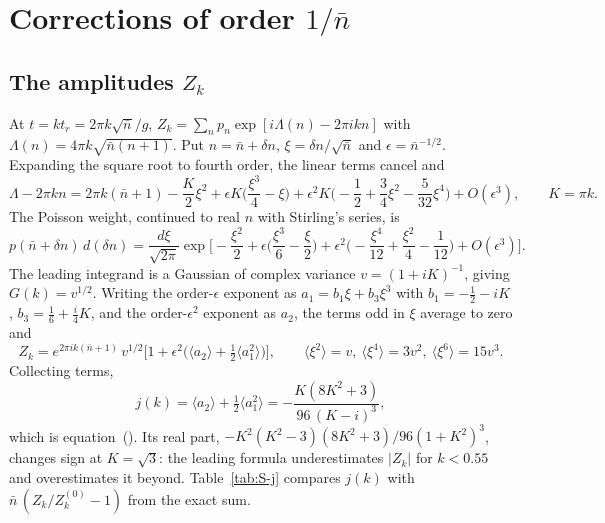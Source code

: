 \documentclass{iopjournal}
\newcommand{\nbar}{\bar{n}}
\begin{document}
\section{Corrections of order $1/\nbar$}

\subsection{The amplitudes $Z_k$}
At $t = kt_r = 2\pi k\sqrt{\nbar}/g$, $Z_k = \sum_n p_n\exp[i\Lambda(n) - 2\pi ikn]$ with $\Lambda(n) = 4\pi k\sqrt{\nbar(n+1)}$. Put $n = \nbar+\delta n$, $\xi = \delta n/\sqrt{\nbar}$ and $\epsilon = \nbar^{-1/2}$. Expanding the square root to fourth order, the linear terms cancel and
\begin{equation}
\Lambda - 2\pi kn = 2\pi k(\nbar+1) - \frac{K}{2}\xi^2 + \epsilon K\Big(\frac{\xi^3}{4}-\xi\Big) + \epsilon^2K\Big(-\frac12+\frac34\xi^2-\frac{5}{32}\xi^4\Big) + O(\epsilon^3),\qquad K = \pi k.
\end{equation}
The Poisson weight, continued to real $n$ with Stirling's series, is
\begin{equation}
p(\nbar+\delta n)\,d(\delta n) = \frac{d\xi}{\sqrt{2\pi}}\exp\!\Big[-\frac{\xi^2}{2} + \epsilon\Big(\frac{\xi^3}{6}-\frac{\xi}{2}\Big) + \epsilon^2\Big(-\frac{\xi^4}{12}+\frac{\xi^2}{4}-\frac1{12}\Big) + O(\epsilon^3)\Big].
\end{equation}
The leading integrand is a Gaussian of complex variance $v = (1+iK)^{-1}$, giving $G(k) = v^{1/2}$. Writing the order-$\epsilon$ exponent as $a_1 = b_1\xi+b_3\xi^3$ with $b_1 = -\tfrac12-iK$, $b_3 = \tfrac16+\tfrac{i}{4}K$, and the order-$\epsilon^2$ exponent as $a_2$, the terms odd in $\xi$ average to zero and
\begin{equation}
Z_k = e^{2\pi ik(\nbar+1)}\,v^{1/2}\Big[1 + \epsilon^2\big(\langle a_2\rangle + \tfrac12\langle a_1^2\rangle\big)\Big],\qquad
\langle\xi^2\rangle = v,\ \langle\xi^4\rangle = 3v^2,\ \langle\xi^6\rangle = 15v^3.
\end{equation}
Collecting terms,
\begin{equation}
j(k) = \langle a_2\rangle+\tfrac12\langle a_1^2\rangle = -\frac{K(8K^2+3)}{96\,(K-i)^3},
\end{equation}
which is equation~(). Its real part, $-K^2(K^2-3)(8K^2+3)/96(1+K^2)^3$, changes sign at $K = \sqrt3$: the leading formula underestimates $|Z_k|$ for $k<0.55$ and overestimates it beyond. Table~\ref{tab:S-j} compares $j(k)$ with $\nbar\,(Z_k/Z_k^{(0)}-1)$ from the exact sum.
\end{document}
